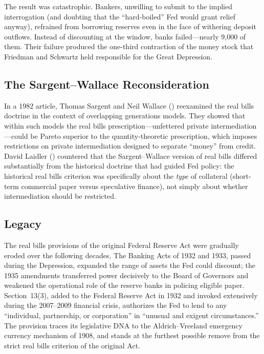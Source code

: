 \documentclass[12pt]{article}
\begin{document}
The result was catastrophic.  Bankers, unwilling to submit to the implied
interrogation (and doubting that the ``hard-boiled'' Fed would grant relief
anyway), refrained from borrowing reserves even in the face of withering deposit
outflows.  Instead of discounting at the window, banks failed---nearly 9{,}000 of
them.  Their failure produced the one-third contraction of the money stock that
Friedman and Schwartz held responsible for the Great Depression.

\subsection{The Sargent--Wallace Reconsideration}

In a 1982 article, Thomas Sargent and Neil Wallace (\citeyear{sargent-wallace1982})
reexamined the real bills doctrine in the context of overlapping generations models.
They showed that within such models the real bills prescription---unfettered private
intermediation---could be Pareto superior to the quantity-theoretic prescription,
which imposes restrictions on private intermediation designed to separate ``money''
from credit.  David Laidler (\citeyear{laidler1984}) countered that the Sargent--Wallace
version of real bills differed substantially from the historical doctrine that had
guided Fed policy: the historical real bills criterion was specifically about the
\emph{type} of collateral (short-term commercial paper versus speculative finance),
not simply about whether intermediation should be restricted.

\subsection{Legacy}

The real bills provisions of the original Federal Reserve Act were gradually
eroded over the following decades.  The Banking Acts of 1932 and 1933, passed
during the Depression, expanded the range of assets the Fed could discount; the 1935
amendments transferred power decisively to the Board of Governors and weakened the
operational role of the reserve banks in policing eligible paper.  Section~13(3),
added to the Federal Reserve Act in 1932 and invoked extensively during the
2007--2009 financial crisis, authorizes the Fed to lend to any ``individual,
partnership, or corporation'' in ``unusual and exigent circumstances.''
The provision traces its legislative DNA to the Aldrich--Vreeland emergency
currency mechanism of 1908, and stands at the furthest possible remove from the
strict real bills criterion of the original Act.
\end{document}
